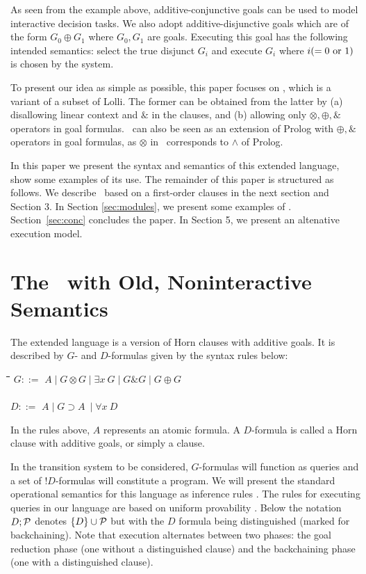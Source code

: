 \documentclass[12pt]{article}
\newcommand{\sep}{\;\vert\;}
\newcommand{\Pscr}{{\cal P}}
\newcommand{\all}{\forall}
\newcommand{\some}{\exists}
\newenvironment{exmple}{
 \begingroup \begin{tabbing} \hspace{2em}\= \hspace{3em}\= \hspace{3em}\=
\hspace{3em}\= \hspace{3em}\= \hspace{3em}\= \kill}{
 \end{tabbing}\endgroup}
\newcommand{\add}{\oplus} \newcommand{\adc}{\&} \newcommand{\Cscr}{{\cal C}}
\begin{document}
     As seen from the example above, additive-conjunctive  goals can be used to model 
interactive decision tasks. We also adopt additive-disjunctive goals which are 
   of the form $G_0 \add G_1$ 
 where $G_0, G_1$ are goals.
Executing this goal has the following intended semantics: select the true disjunct
$G_i$ and execute $G_i$ where $i (= 0\ {\rm or}\ 1)$ is chosen by the system.

   To present our idea as simple as possible, this paper focuses on \muprolog,
 which is a variant of a  subset of Lolli\cite{HM94}. 
The former can be obtained
from the latter by (a) disallowing linear context and $\adc$ in the clauses, and (b) allowing only
          $\otimes, \oplus, \&$ operators   in goal formulas. \muprolog\ can also be seen
as an extension of Prolog with $\oplus, \&$ operators   in goal formulas, as
$\otimes$ in \muprolog\ corresponds to $\land$ of Prolog.


In this paper we present the syntax and semantics of this extended language, 
show some examples of its use. 
The remainder of this paper is structured as follows. We describe  \muprolog\
based on a first-order  clauses  in
the next section and Section 3. In Section \ref{sec:modules}, we
present some examples of  \muprolog. 
Section~\ref{sec:conc} concludes the paper. In Section 5, we
present an altenative execution model.

\section{The \muprolog\ with Old, Noninteractive Semantics}\label{sec:logic1}

The extended language is a version of Horn clauses
 with additive goals. It is described
by $G$- and $D$-formulas given by the syntax rules below:
\begin{exmple}
\>$G ::=$ \>  $A \sep   G \otimes  G \sep    \some x\ G \sep  G \adc G \sep  G \add G $ \\   \\
\>$D ::=$ \>  $A  \sep G \supset A\ \sep \all x\ D $\\
\end{exmple}
\noindent
In the rules above, $A$  represents an atomic formula.
A $D$-formula  is called a  Horn
 clause with additive goals, or simply a clause. 

In the transition system to be considered, $G$-formulas will function as 
queries and a set of $!D$-formulas will constitute  a program. 
 We will  present the standard operational 
semantics for this language  as inference rules \cite{Khan87}. 
The rules for executing queries in our language are based on
uniform provability \cite{HM94,MNPS91}. Below the notation $D;\Pscr$ denotes
$\{ D \} \cup \Pscr$ but with the $D$ formula being distinguished
(marked for backchaining). Note that execution  alternates between 
two phases: the goal reduction phase (one  without a distinguished clause)
and the backchaining phase (one with a distinguished clause).
\end{document}
